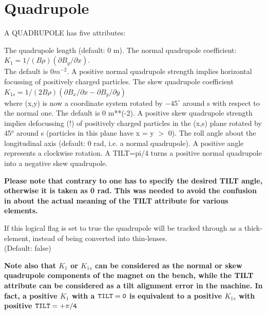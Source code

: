 \section{Quadrupole}
\label{sec:quadrupole}



A QUADRUPOLE has five attributes:     
\begin{madlist}
    The quadrupole length (default: 0 m). 
    The normal quadrupole coefficient:        
     $K_1 = 1/(B \rho) (\partial B_y / \partial x)$.\\ 
     The default is $0 m^{-2}$. A positive normal quadrupole strength
     implies horizontal focussing of positively charged particles.  
    The skew quadrupole coefficient 
     $K_{1s} = 1/(2 B \rho) (\partial B_x / \partial x - \partial B_y / \partial y)$\\  
     where (x,y) is now a coordinate system rotated by $-45^\circ$ around s
     with respect to the normal one. The default is 0  m**(-2). A
     positive skew quadrupole strength implies defocussing (!) of
     positively charged particles in the (x,s) plane rotated by 45$^o$
     around s (particles in this plane have x = y $>$ 0). 
    The roll angle about the longitudinal axis (default: 0
     rad, i.e. a normal quadrupole). A positive angle represents a
     clockwise rotation. A TILT=pi/4 turns a positive normal quadrupole
     into a negative skew quadrupole.          

\textbf{Please note that contrary to \madeight one has to
  specify the desired TILT angle, otherwise it is taken as
  0 rad. This was needed to avoid the confusion in \madeight
  about the actual meaning of the TILT attribute for
  various elements. } 

     If this logical flag is set to true the quadrupole
    will be tracked through as a thick-element, instead of being
    converted into thin-lenses.\\
    (Default: false)
\end{madlist}

\textbf{Note also that $K_1$ or $K_{1s}$ can be considered as
  the normal or skew quadrupole components of the magnet on
  the bench, while the TILT attribute can be considered as a
  tilt alignment error in the machine. In fact, a positive
  $K_1$ with a $\tt{TILT} = 0$ is equivalent to a positive $K_{1s}$
  with positive $\tt{TILT} = +\pi/4$ } 

